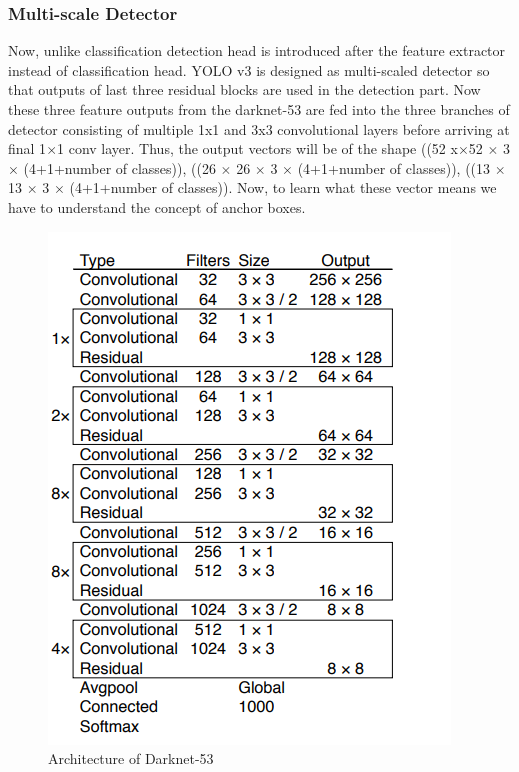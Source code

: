 \subsubsection{Multi-scale Detector}
  Now, unlike classification detection head is introduced after the feature extractor instead of classification head. YOLO v3 is designed as multi-scaled detector so that outputs of last three residual blocks are used in the detection part. Now these three feature outputs from the darknet-53 are fed into the three branches of detector consisting of multiple 1x1 and 3x3 convolutional layers before arriving at final 1$\times$1 conv layer. Thus, the output vectors will be of the shape ((52 x$\times$52 $\times$ 3 $\times$ (4+1+number of classes)),  ((26 $\times$ 26 $\times$ 3 $\times$ (4+1+number of classes)), ((13 $\times$ 13 $\times$ 3 $\times$ (4+1+number of classes)). Now, to learn what these vector means we have to understand the concept of anchor boxes.
  \begin{figure}[H]
    \centering
    \captionsetup{justification = centering}
    \includegraphics[scale= 1]{CHAPTERS/Chapter-5/images/5.3.PNG}
    \caption{Architecture of Darknet-53} 
    \label{fig:5.3}
  \end{figure}
